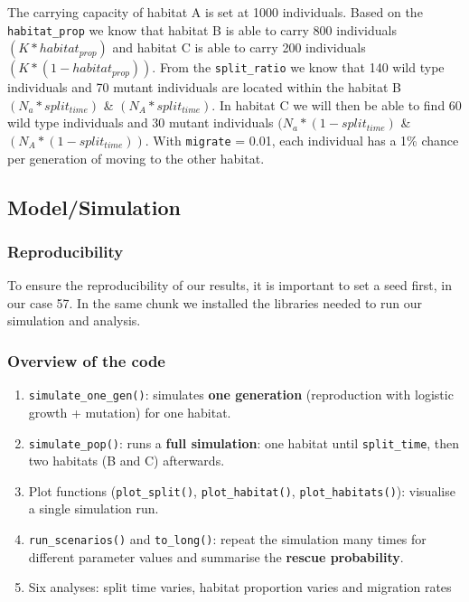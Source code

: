 \documentclass[
]{article}
\providecommand{\tightlist}{%
  \setlength{\itemsep}{0pt}\setlength{\parskip}{0pt}}
\begin{document}
The carrying capacity of habitat A is set at 1000 individuals. Based on
the \texttt{habitat\_prop} we know that habitat B is able to carry 800
individuals \((K * habitat_{prop})\) and habitat C is able to carry 200
individuals \((K*(1-habitat_{prop}))\). From the \texttt{split\_ratio}
we know that 140 wild type individuals and 70 mutant individuals are
located within the habitat B \((N_{a} * split_{time})\) \&
\((N_{A} * split_{time})\). In habitat C we will then be able to find 60
wild type individuals and 30 mutant individuals
\((N_{a} * (1- split_{time})\) \& \((N_{A} * (1- split_{time}))\). With
\texttt{migrate} = 0.01, each individual has a 1\% chance per generation
of moving to the other habitat.

\subsection{Model/Simulation}\label{modelsimulation}

\subsubsection{Reproducibility}\label{reproducibility}

To ensure the reproducibility of our results, it is important to set a
seed first, in our case 57. In the same chunk we installed the libraries
needed to run our simulation and analysis.

\subsubsection{Overview of the code}\label{overview-of-the-code}

\begin{enumerate}
\def\labelenumi{\arabic{enumi}.}
\tightlist
\item
  \texttt{simulate\_one\_gen()}: simulates \textbf{one generation}
  (reproduction with logistic growth + mutation) for one habitat.
\item
  \texttt{simulate\_pop()}: runs a \textbf{full simulation}: one habitat
  until \texttt{split\_time}, then two habitats (B and C) afterwards.
\item
  Plot functions (\texttt{plot\_split()}, \texttt{plot\_habitat()},
  \texttt{plot\_habitats()}): visualise a single simulation run.
\item
  \texttt{run\_scenarios()} and \texttt{to\_long()}: repeat the
  simulation many times for different parameter values and summarise the
  \textbf{rescue probability}.
\item
  Six analyses: split time varies, habitat proportion varies and
  migration rates
\end{enumerate}
\end{document}

